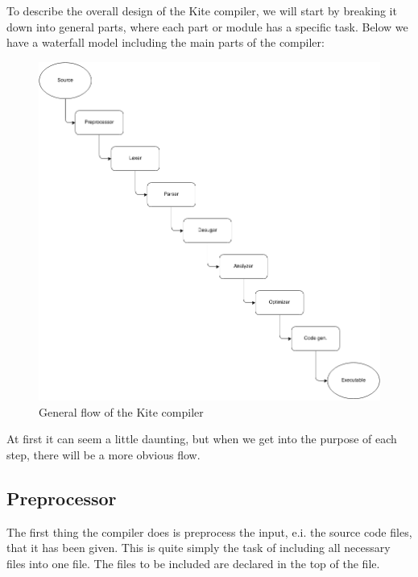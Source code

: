 
To describe the overall design of the Kite compiler, we will start by
breaking it down into general parts, where each part or module has a
specific task. Below we have a waterfall model including the main
parts of the compiler:

\begin{figure}[H]
  \label{fig:flow}
  \center
  \includegraphics[scale=0.45]{images/flow.png}
  \caption{General flow of the Kite compiler}
\end{figure}

At first it can seem a little daunting, but when we get into the
purpose of each step, there will be a more obvious flow.

\subsection{Preprocessor}
The first thing the compiler does is preprocess the input, e.i. the
source code files, that it has been given. This is quite simply the
task of including all necessary files into one file. The files to be
included are declared in the top of the file.

